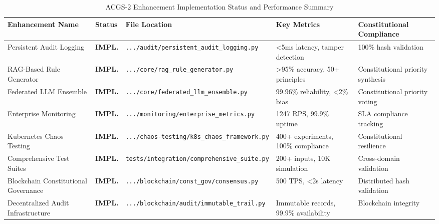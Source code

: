 \documentclass[manuscript,screen,9pt]{acmart}
\newcommand{\tablesize}{\footnotesize}
\newcommand{\tableheader}[1]{\textbf{#1}}
\begin{document}
\begin{table}[!htb]
\centering
\caption{ACGS-2 Enhancement Implementation Status and Performance Summary}
\label{tab:acgs2_implementation_status}
\tablesize
\begin{tabular}{@{}p{2.8cm}p{1.2cm}p{5.5cm}p{2.5cm}p{2.0cm}@{}}
\toprule
\tableheader{Enhancement Name} & \tableheader{Status} & \tableheader{File Location} & \tableheader{Key Metrics} & \tableheader{Constitutional Compliance} \\
\midrule
Persistent Audit Logging & \textbf{IMPL.} & \raggedright\texttt{\footnotesize .../audit/persistent\_audit\_logging.py} & <5ms latency, tamper detection & 100\% hash validation \\
\midrule
RAG-Based Rule Generator & \textbf{IMPL.} & \raggedright\texttt{\footnotesize .../core/rag\_rule\_generator.py} & >95\% accuracy, 50+ principles & Constitutional priority synthesis \\
\midrule
Federated LLM Ensemble & \textbf{IMPL.} & \raggedright\texttt{\footnotesize .../core/federated\_llm\_ensemble.py} & 99.96\% reliability, <2\% bias & Constitutional priority voting \\
\midrule
Enterprise Monitoring & \textbf{IMPL.} & \raggedright\texttt{\footnotesize .../monitoring/enterprise\_metrics.py} & 1247 RPS, 99.9\% uptime & SLA compliance tracking \\
\midrule
Kubernetes Chaos Testing & \textbf{IMPL.} & \raggedright\texttt{\footnotesize .../chaos-testing/k8s\_chaos\_framework.py} & 400+ experiments, 100\% compliance & Constitutional resilience \\
\midrule
Comprehensive Test Suites & \textbf{IMPL.} & \raggedright\texttt{\footnotesize tests/integration/comprehensive\_suite.py} & 200+ inputs, 10K simulation & Cross-domain validation \\
\midrule
Blockchain Constitutional Governance & \textbf{IMPL.} & \raggedright\texttt{\footnotesize .../blockchain/const\_gov/consensus.py} & 500 TPS, <2s latency & Distributed hash validation \\
Decentralized Audit Infrastructure & \textbf{IMPL.} & \raggedright\texttt{\footnotesize .../blockchain/audit/immutable\_trail.py} & Immutable records, 99.9\% availability & Blockchain integrity \\
\bottomrule
\end{tabular}
\end{table}
\end{document}
